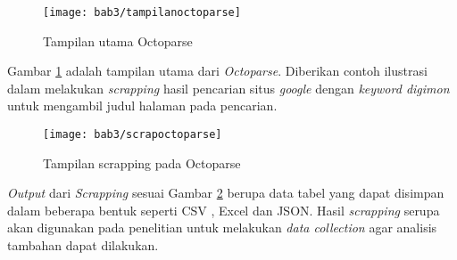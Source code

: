 \begin{figure}[H]
	\centering  
	\texttt{[image: bab3/tampilanoctoparse]}   
	\caption{Tampilan utama Octoparse}
	\label{fig:tampilanoctoparse} 
\end{figure} 

Gambar \ref{fig:tampilanoctoparse} adalah tampilan utama dari \textit{Octoparse}. Diberikan contoh ilustrasi dalam melakukan \textit{scrapping} hasil pencarian situs \textit{google} dengan \textit{keyword digimon} untuk mengambil judul halaman pada pencarian.

\begin{figure}[H]
	\centering  
	\texttt{[image: bab3/scrapoctoparse]}    
	\caption{Tampilan scrapping pada Octoparse}
	\label{fig:hasiloctoparse}
\end{figure} 

\textit{Output} dari \textit{Scrapping} sesuai Gambar \ref{fig:hasiloctoparse} berupa data tabel yang dapat disimpan dalam beberapa bentuk seperti CSV , Excel dan JSON. Hasil \textit{scrapping} serupa akan digunakan pada penelitian untuk melakukan \textit{data collection} agar analisis tambahan dapat dilakukan. 
